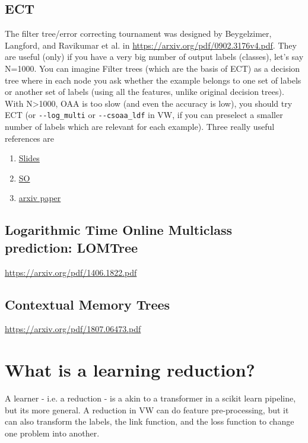\documentclass[preview,border={30 30 30 30}]{standalone}
\begin{document}
\subsection{ECT}
The filter tree/error correcting tournament was designed by Beygelzimer, Langford, and Ravikumar et al. in \url{https://arxiv.org/pdf/0902.3176v4.pdf}. They are useful (only) if you have a very big number of output labels (classes), let's say N=1000. 
You can imagine Filter trees (which are the basis of ECT) as a decision tree where in each node you ask whether the example belongs to one set of labels or another set of labels (using all the features, unlike original decision trees). With N>1000, OAA is too slow (and even the accuracy is low), you should try ECT (or \verb|--log_multi| or \verb|--csoaa_ldf| in VW, if you can preselect a smaller number of labels which are relevant for each example). Three really useful references are
\begin{enumerate}
    \item \href{https://cilvr.cs.nyu.edu/diglib/lsml/logarithmic.pdf}{Slides}
    \item \href{https://stackoverflow.com/questions/24607514/error-correcting-tournaments-ect-multi-class-classification-in-vowpal-wabbit}{SO}
    \item \href{https://arxiv.org/pdf/0902.3176v4.pdf}{arxiv paper}
\end{enumerate}

\subsection{Logarithmic Time Online Multiclass prediction: LOMTree}
\url{https://arxiv.org/pdf/1406.1822.pdf}

\subsection{Contextual Memory Trees}
\url{https://arxiv.org/pdf/1807.06473.pdf}

\section{What is a learning reduction?}
A learner - i.e. a reduction - is a akin to a transformer in a scikit learn pipeline, but its more general. A reduction in VW can do feature pre-processing, but it can also transform the labels, the link function, and the loss function to change one problem into another.


\end{document}
